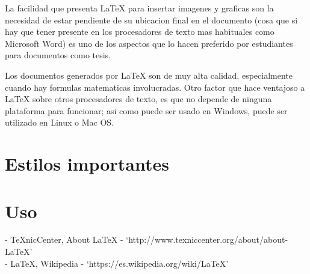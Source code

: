 \documentclass[11pt]{article}
\begin{document}
La facilidad que presenta \LaTeX{} para insertar imagenes y graficas son la necesidad de estar pendiente de su ubicacion final en el documento (cosa que si hay que tener presente en los procesadores de texto mas habituales como Microsoft Word) es uno de los aspectos que lo hacen preferido por estudiantes para documentos como tesis.

Los documentos generados por \LaTeX{} son de muy alta calidad, especialmente cuando hay formulas matematicas involucradas. Otro factor que hace ventajoso a \LaTeX{} sobre otros procesadores de texto, es que no depende de ninguna plataforma para funcionar; asi como puede ser usado en Windows, puede ser utilizado en Linux o Mac OS.

\section{Estilos importantes}


\section{Uso}

\begin{thebibliography}{99}
- TeXnicCenter, About \LaTeX{} - `http://www.texniccenter.org/about/about-\LaTeX{}'
\\- \LaTeX{}, Wikipedia - `https://es.wikipedia.org/wiki/\LaTeX{}'
\end{thebibliography}
\end{document}
